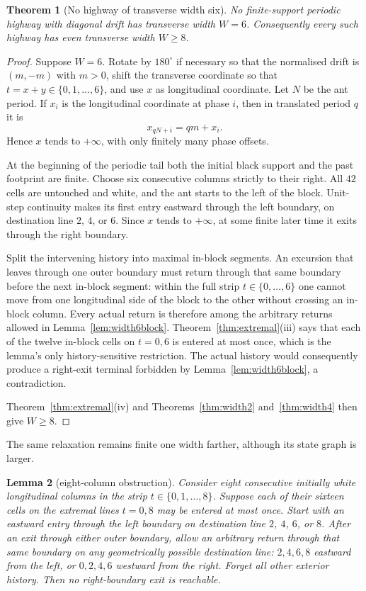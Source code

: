 \documentclass[11pt,letterpaper]{article}
\theoremstyle{plain}
\newtheorem{theorem}{Theorem}[section]
\newtheorem{lemma}[theorem]{Lemma}
\theoremstyle{definition}
\begin{document}
\begin{NoHyper}
\begin{theorem}[No highway of transverse width six]\label{thm:width6}
No finite-support periodic highway with diagonal drift has transverse width $W=6$.
Consequently every such highway has even transverse width $W\ge8$.
\end{theorem}

\begin{proof}
Suppose $W=6$.  Rotate by $180^\circ$ if necessary so that the normalised drift is
$(m,-m)$ with $m>0$, shift the transverse coordinate so that
$t=x+y\in\{0,1,\ldots,6\}$, and use $x$ as longitudinal coordinate.  Let $N$ be the
ant period.  If $x_i$ is the longitudinal coordinate at phase $i$, then in translated
period $q$ it is
\[
x_{qN+i}=qm+x_i.
\]
Hence $x$ tends to $+\infty$, with only finitely many phase offsets.

At the beginning of the periodic tail both the initial black support and the past
footprint are finite.  Choose six consecutive columns strictly to their right.  All
$42$ cells are untouched and white, and the ant starts to the left of the block.
Unit-step continuity makes its first entry eastward through the left boundary, on
destination line $2$, $4$, or $6$.  Since $x$ tends to $+\infty$, at some finite
later time it exits through the right boundary.

Split the intervening history into maximal in-block segments.  An excursion that
leaves through one outer boundary must return through that same boundary before the
next in-block segment: within the full strip $t\in\{0,\ldots,6\}$ one cannot move
from one longitudinal side of the block to the other without crossing an in-block
column.  Every actual return is therefore among the arbitrary returns allowed in
Lemma~\ref{lem:width6block}.  Theorem~\ref{thm:extremal}(iii) says that each of the
twelve in-block cells on $t=0,6$ is entered at most once, which is the lemma's only
history-sensitive restriction.  The actual history would consequently produce a
right-exit terminal forbidden by Lemma~\ref{lem:width6block}, a contradiction.

Theorem~\ref{thm:extremal}(iv) and Theorems~\ref{thm:width2} and~\ref{thm:width4}
then give $W\ge8$.
\end{proof}

The same relaxation remains finite one width farther, although its state graph is
larger.

\begin{lemma}[eight-column obstruction]\label{lem:width8block}
Consider eight consecutive initially white longitudinal columns in the strip
$t\in\{0,1,\ldots,8\}$.  Suppose each of their sixteen cells on the extremal lines
$t=0,8$ may be entered at most once.  Start with an eastward entry through the left
boundary on destination line $2$, $4$, $6$, or $8$.  After an exit through either
outer boundary, allow an arbitrary return through that same boundary on any
geometrically possible destination line: $2,4,6,8$ eastward from the left, or
$0,2,4,6$ westward from the right.  Forget all other exterior history.  Then no
right-boundary exit is reachable.
\end{lemma}


\end{NoHyper}
\end{document}
